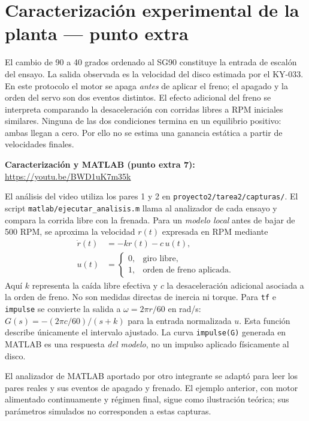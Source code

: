 \documentclass[9pt,a4paper,twocolumn]{extarticle}
\begin{document}
\section{Caracterización experimental de la planta --- punto extra}
\label{caracterizaciuxf3n-experimental-de-la-planta-punto-extra}

El cambio de 90 a 40 grados ordenado al SG90 constituye la entrada
de escalón del ensayo. La salida observada es la velocidad del disco
estimada por el KY-033. En este protocolo el motor se apaga
\emph{antes} de aplicar el freno; el apagado y la orden del servo son
dos eventos distintos. El efecto adicional del freno se interpreta
comparando la desaceleración con corridas libres a RPM iniciales
similares. Ninguna de las dos condiciones termina en un equilibrio
positivo: ambas llegan a cero. Por ello no se estima una ganancia
estática a partir de velocidades finales.

\textbf{Caracterización y MATLAB (punto extra 7):}\\
\url{https://youtu.be/BWD1uK7m35k}

El análisis del video utiliza los pares 1 y 2 en
\texttt{proyecto2/tarea2/capturas/}. El script
\texttt{matlab/ejecutar\_analisis.m} llama al analizador de cada
ensayo y compara la corrida libre con la frenada. Para un
\emph{modelo local} antes de bajar de 500 RPM, se aproxima la
velocidad $r(t)$ expresada en RPM mediante
\begin{equation}
\begin{aligned}
\dot r(t)&=-kr(t)-c\,u(t),\\
u(t)&=\begin{cases}
0,&\text{giro libre},\\
1,&\text{orden de freno aplicada}.
\end{cases}
\end{aligned}
\end{equation}
Aquí $k$ representa la caída libre efectiva y $c$ la desaceleración
adicional asociada a la orden de freno. No son medidas directas de
inercia ni torque. Para \texttt{tf} e \texttt{impulse} se convierte
la salida a $\omega=2\pi r/60$ en rad/s:
$G(s)=-(2\pi c/60)/(s+k)$ para la entrada normalizada $u$.
Esta función describe únicamente el intervalo ajustado. La curva
\texttt{impulse(G)} generada en MATLAB es una respuesta
\emph{del modelo}, no un impulso aplicado físicamente al disco.

El analizador de MATLAB aportado por otro integrante se adaptó
para leer los pares reales y sus eventos de apagado y frenado.
El ejemplo anterior, con motor alimentado continuamente y régimen
final, sigue como ilustración teórica; sus parámetros simulados
no corresponden a estas capturas.
\end{document}
